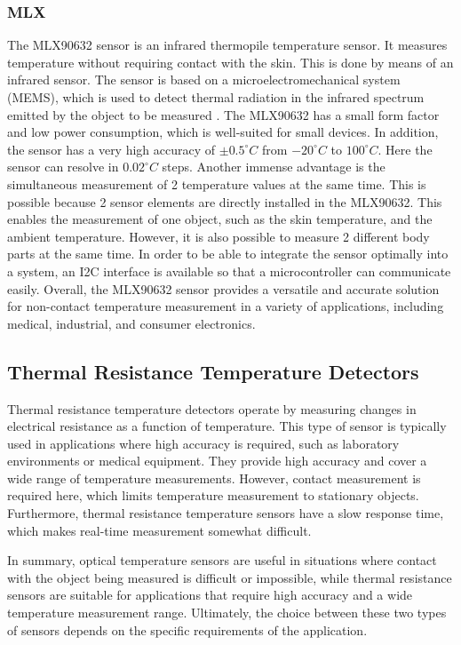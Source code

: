 \subsubsection{MLX}
\label{Background:TemperatureSensors:OpticalTS:MLX}
The MLX90632 sensor is an infrared thermopile temperature sensor.
It measures temperature without requiring contact with the skin. 
This is done by means of an infrared sensor. 
The sensor is based on a microelectromechanical system (MEMS), which is used to detect thermal radiation in the infrared spectrum emitted by the object to be measured \cite{melexisMLX90632FIRSensor2021}.
The MLX90632 has a small form factor and low power consumption, which is well-suited for small devices.
In addition, the sensor has a very high accuracy of $\pm 0.5 ^\circ C$ from $-20 ^\circ C$  to $100 ^\circ C$.
Here the sensor can resolve in $0.02 ^\circ C$ steps.
Another immense advantage is the simultaneous measurement of 2 temperature values at the same time.
This is possible because 2 sensor elements are directly installed in the MLX90632.
This enables the measurement of one object, such as the skin temperature, and the ambient temperature.
However, it is also possible to measure 2 different body parts at the same time.
In order to be able to integrate the sensor optimally into a system, an I2C interface is available so that a microcontroller can communicate easily.
Overall, the MLX90632 sensor provides a versatile and accurate solution for non-contact temperature measurement in a variety of applications, including medical, industrial, and consumer electronics.

\subsection{Thermal Resistance Temperature Detectors}
\label{Background:TemperatureSensors:ResistanceTD}
Thermal resistance temperature detectors operate by measuring changes in electrical resistance as a function of temperature. 
This type of sensor is typically used in applications where high accuracy is required, such as laboratory environments or medical equipment.
They provide high accuracy and cover a wide range of temperature measurements.
However, contact measurement is required here, which limits temperature measurement to stationary objects.
Furthermore, thermal resistance temperature sensors have a slow response time, which makes real-time measurement somewhat difficult.

In summary, optical temperature sensors are useful in situations where contact with the object being measured is difficult or impossible, while thermal resistance sensors are suitable for applications that require high accuracy and a wide temperature measurement range. 
Ultimately, the choice between these two types of sensors depends on the specific requirements of the application.

